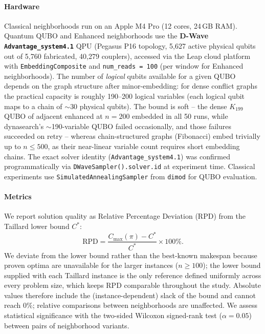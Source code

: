 \documentclass[preprint,12pt,authoryear]{elsarticle}
\begin{document}
\paragraph{Hardware}
Classical neighborhoods run on an Apple M4 Pro (12 cores, 24\,GB RAM).
Quantum QUBO and Enhanced neighborhoods use the \textbf{D-Wave
\texttt{Advantage\_system4.1}} QPU (Pegasus P16 topology, 5{,}627 active
physical qubits out of 5{,}760 fabricated, 40{,}279 couplers), accessed
via the Leap cloud platform with \texttt{EmbeddingComposite} and
\texttt{num\_reads\,=\,100} (per window for Enhanced neighborhoods).
The number of \emph{logical} qubits available for a given QUBO depends on
the graph structure after minor-embedding: for dense conflict graphs
the practical capacity is roughly 190--200 logical variables (each
logical qubit maps to a chain of $\sim$30 physical qubits). The bound
is soft -- the dense $K_{199}$ QUBO of adjacent enhanced at $n = 200$
embedded in all 50 runs, while dynasearch's $\sim$190-variable QUBO
failed occasionally, and those failures succeeded on retry -- whereas
chain-structured graphs (Fibonacci) embed trivially up to $n \leq 500$,
as their near-linear variable count requires short embedding chains.
The exact solver identity (\texttt{Advantage\_system4.1}) was confirmed
programmatically via \texttt{DWaveSampler().solver.id} at experiment time.
Classical experiments use \texttt{SimulatedAnnealingSampler} from
\texttt{dimod} for QUBO evaluation.

\paragraph{Metrics}
We report solution quality as Relative Percentage Deviation (RPD)
from the Taillard lower bound $C^*$:
\begin{equation}
  \mathrm{RPD} = \frac{C_{\max}(\pi) - C^*}{C^*} \times 100\%.
  \label{eq:rpd}
\end{equation}
We deviate from the lower bound rather than the best-known makespan
because proven optima are unavailable for the larger instances
($n \geq 100$); the lower bound supplied with each Taillard instance is
the only reference defined uniformly across every problem size, which
keeps RPD comparable throughout the study. Absolute values therefore
include the (instance-dependent) slack of the bound and cannot reach
$0\%$; relative comparisons between neighborhoods are unaffected.
We assess statistical significance with the two-sided Wilcoxon
signed-rank test ($\alpha = 0.05$) between pairs of neighborhood variants.
\end{document}
